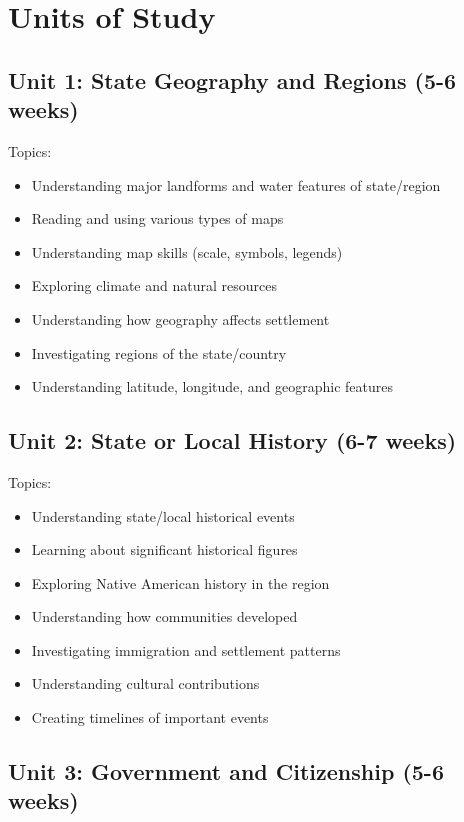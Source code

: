 \documentclass[11pt,letterpaper]{report}
\begin{document}
\section{Units of Study}

\subsection{Unit 1: State Geography and Regions (5-6 weeks)}

Topics:
\begin{itemize}
\item Understanding major landforms and water features of state/region
\item Reading and using various types of maps
\item Understanding map skills (scale, symbols, legends)
\item Exploring climate and natural resources
\item Understanding how geography affects settlement
\item Investigating regions of the state/country
\item Understanding latitude, longitude, and geographic features
\end{itemize}

\subsection{Unit 2: State or Local History (6-7 weeks)}

Topics:
\begin{itemize}
\item Understanding state/local historical events
\item Learning about significant historical figures
\item Exploring Native American history in the region
\item Understanding how communities developed
\item Investigating immigration and settlement patterns
\item Understanding cultural contributions
\item Creating timelines of important events
\end{itemize}

\subsection{Unit 3: Government and Citizenship (5-6 weeks)}
\end{document}
